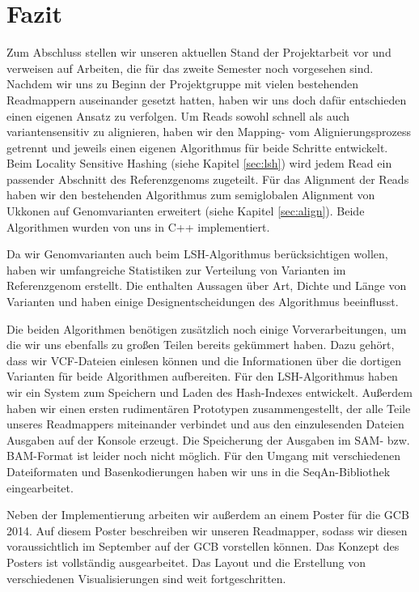 \chapter{Fazit}
\label{sec:fazit}
Zum Abschluss stellen wir unseren aktuellen Stand der Projektarbeit vor und verweisen auf Arbeiten, die für das zweite Semester noch vorgesehen sind. Nachdem wir uns zu Beginn der Projektgruppe mit vielen bestehenden Readmappern auseinander gesetzt hatten, haben wir uns doch dafür entschieden einen eigenen Ansatz zu verfolgen. Um Reads sowohl schnell als auch variantensensitiv zu alignieren, haben wir den Mapping- vom Alignierungsprozess getrennt und jeweils einen eigenen Algorithmus für beide Schritte entwickelt. Beim Locality Sensitive Hashing (siehe Kapitel \ref{sec:lsh}) wird jedem Read ein passender Abschnitt des Referenzgenoms zugeteilt. Für das Alignment der Reads haben wir den bestehenden Algorithmus zum semiglobalen Alignment von Ukkonen auf Genomvarianten erweitert (siehe Kapitel \ref{sec:align}). Beide Algorithmen wurden von uns in C++ implementiert.

Da wir Genomvarianten auch beim LSH-Algorithmus berücksichtigen wollen, haben wir umfangreiche Statistiken zur Verteilung von Varianten im Referenzgenom erstellt. Die enthalten Aussagen über Art, Dichte und Länge von Varianten und haben einige Designentscheidungen des Algorithmus beeinflusst.

Die beiden Algorithmen benötigen zusätzlich noch einige Vorverarbeitungen, um die wir uns ebenfalls zu großen Teilen bereits gekümmert haben. Dazu gehört, dass wir VCF-Dateien einlesen können und die Informationen über die dortigen Varianten für beide Algorithmen aufbereiten. Für den LSH-Algorithmus haben wir ein System zum Speichern und Laden des Hash-Indexes entwickelt. Außerdem haben wir einen ersten rudimentären Prototypen zusammengestellt, der alle Teile unseres Readmappers miteinander verbindet und aus den einzulesenden Dateien Ausgaben auf der Konsole erzeugt. Die Speicherung der Ausgaben im SAM- bzw. BAM-Format ist leider noch nicht möglich. Für den Umgang mit verschiedenen Dateiformaten und Basenkodierungen haben wir uns in die SeqAn-Bibliothek eingearbeitet.

Neben der Implementierung arbeiten wir außerdem an einem Poster für die GCB 2014. Auf diesem Poster beschreiben wir unseren Readmapper, sodass wir diesen voraussichtlich im September auf der GCB vorstellen können. Das Konzept des Posters ist vollständig ausgearbeitet. Das Layout und die Erstellung von verschiedenen Visualisierungen sind weit fortgeschritten.

